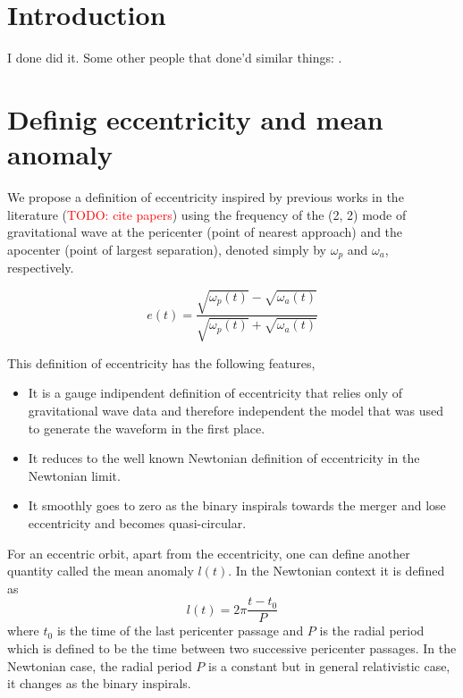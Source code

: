 \documentclass[aps,prd,amsmath,floats,floatfix, twocolumn,
superscriptaddress,nofootinbib,showpacs]{revtex4-1}
\newcommand{\red}{\textcolor{red}}
\newcommand{\TODO}[1]{\red{TODO: #1}}
\begin{document}
\maketitle

\section{Introduction}
\label{sec:introduction}
I done did it. Some other people that done'd similar things:
\cite{Scott:2015rza}.

\section{Definig eccentricity and mean anomaly}
\label{sec:defining-eccentricity-and-mean-anomaly}
We propose a definition of eccentricity inspired by previous works in
the literature (\TODO{cite papers}) using the frequency of the (2, 2)
mode of gravitational wave at the pericenter (point of nearest
approach) and the apocenter (point of largest separation), denoted
simply by $\omega_{p}$ and $\omega_{a}$, respectively.

\begin{equation}
\label{eq:eccentricity_definition} e(t) = \frac{\sqrt{\omega_{p}(t)} -
\sqrt{\omega_{a}(t)}}{\sqrt{\omega_{p}(t)} + \sqrt{\omega_{a}(t)}}
\end{equation}

This definition of eccentricity has the following features,
\begin{itemize}
\item It is a gauge indipendent definition of eccentricity that relies
only of gravitational wave data and therefore independent the model
that was used to generate the waveform in the first place.
\item It reduces to the well known Newtonian definition of
eccentricity in the Newtonian limit.
\item It smoothly goes to zero as the binary inspirals towards the
merger and lose eccentricity and becomes quasi-circular.
\end{itemize}

For an eccentric orbit, apart from the eccentricity, one can define
another quantity called the mean anomaly $l(t)$. In the Newtonian
context it is defined as
\begin{equation}
\label{eq:mean_anomaly_definition} l(t) = 2\pi \frac{t - t_0}{P}
\end{equation} where $t_0$ is the time of the last pericenter passage
and $P$ is the radial period which is defined to be the time between
two successive pericenter passages.  In the Newtonian case, the radial
period $P$ is a constant but in general relativistic case, it changes
as the binary inspirals.
\end{document}
